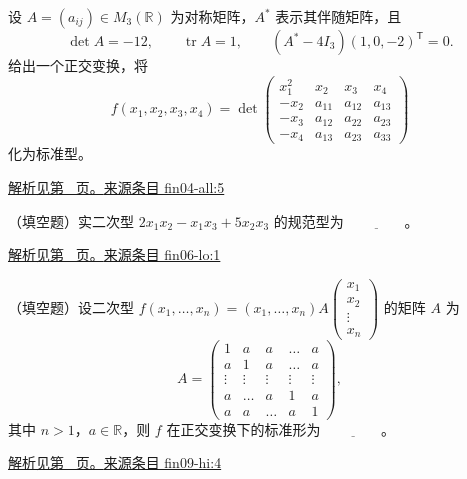 \documentclass[12pt,fontset=fandol]{ctexart}
\begin{document}
\begin{example}\label{ex:fin04-all:5}

设 $A=(a_{ij})\in M_3(\mathbb R)$ 为对称矩阵，$A^*$ 表示其伴随矩阵，且
\[
\det A=-12,\qquad\operatorname{tr}A=1,\qquad
(A^*-4I_3)(1,0,-2)^{\mathsf T}=0.
\]
给出一个正交变换，将
\[
f(x_1,x_2,x_3,x_4)=
\det\begin{pmatrix}
x_1^2&x_2&x_3&x_4\\
-x_2&a_{11}&a_{12}&a_{13}\\
-x_3&a_{12}&a_{22}&a_{23}\\
-x_4&a_{13}&a_{23}&a_{33}
\end{pmatrix}
\]
化为标准型。

\par\hyperref[ans:fin04-all:5]{解析见第~\pageref{ans:fin04-all:5} 页。}\quad\href{https://github.com/lzxcr/cmc-mathematics/blob/64916fa1fdbc3e444a652eca204d5669058ee321/src/problems/finals/04/05.md}{来源条目 fin04-all:5}

\end{example}

\begin{example}\label{ex:fin06-lo:1}

（填空题）实二次型 $2x_1x_2-x_1x_3+5x_2x_3$ 的规范型为 $\underline{\qquad\qquad}$。

\par\hyperref[ans:fin06-lo:1]{解析见第~\pageref{ans:fin06-lo:1} 页。}\quad\href{https://github.com/lzxcr/cmc-mathematics/blob/64916fa1fdbc3e444a652eca204d5669058ee321/src/problems/finals/06/01.md}{来源条目 fin06-lo:1}

\end{example}

\begin{example}\label{ex:fin09-hi:4}

（填空题）设二次型 $f(x_{1},\dots,x_{n})=(x_{1},\dots,x_{n})A\begin{pmatrix}x_{1}\\x_{2}\\\vdots\\x_{n}\end{pmatrix}$ 的矩阵 $A$ 为
\[
A=\begin{pmatrix}1&a&a&\dots&a\\a&1&a&\dots&a\\\vdots&\vdots&\vdots&\vdots&\vdots\\a&\dots&a&1&a\\a&a&\dots&a&1\end{pmatrix},
\]
其中 $n>1$，$a \in \mathbb{R}$，则 $f$ 在正交变换下的标准形为 $\underline{\qquad\qquad}$。

\par\hyperref[ans:fin09-hi:4]{解析见第~\pageref{ans:fin09-hi:4} 页。}\quad\href{https://github.com/lzxcr/cmc-mathematics/blob/64916fa1fdbc3e444a652eca204d5669058ee321/src/problems/finals/09/04.md}{来源条目 fin09-hi:4}

\end{example}
\end{document}
